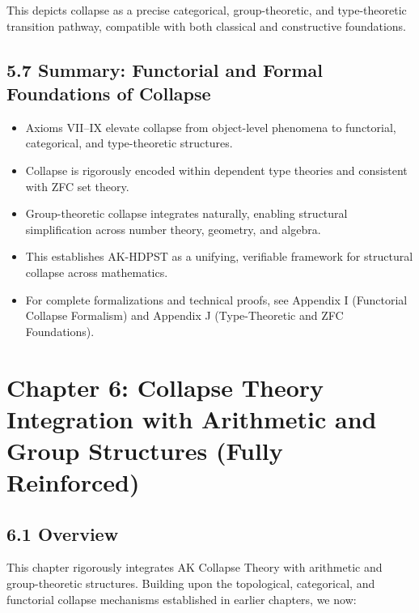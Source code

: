 \documentclass[11pt]{article}
\begin{document}
This depicts collapse as a precise categorical, group-theoretic, and type-theoretic transition pathway, compatible with both classical and constructive foundations.

\subsection*{5.7 Summary: Functorial and Formal Foundations of Collapse}

\begin{itemize}
    \item Axioms VII–IX elevate collapse from object-level phenomena to functorial, categorical, and type-theoretic structures.
    \item Collapse is rigorously encoded within dependent type theories and consistent with ZFC set theory.
    \item Group-theoretic collapse integrates naturally, enabling structural simplification across number theory, geometry, and algebra.
    \item This establishes AK-HDPST as a unifying, verifiable framework for structural collapse across mathematics.
    \item For complete formalizations and technical proofs, see Appendix I (Functorial Collapse Formalism) and Appendix J (Type-Theoretic and ZFC Foundations).
\end{itemize}




\section{Chapter 6: Collapse Theory Integration with Arithmetic and Group Structures (Fully Reinforced)}

\subsection*{6.1 Overview}

This chapter rigorously integrates AK Collapse Theory with arithmetic and group-theoretic structures. Building upon the topological, categorical, and functorial collapse mechanisms established in earlier chapters, we now:
\end{document}
